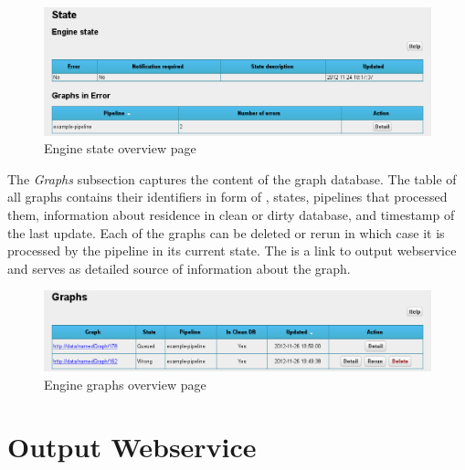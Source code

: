 \begin{figure}[!ht]
    \centering
    \includegraphics[width=\textwidth]{images/fe-engine-state.png}
    \caption{Engine state overview page}
	\label{fig:feEngineState}
\end{figure}
\FloatBarrier

The \emph{Graphs} subsection captures the content of the graph database. The table of all graphs contains their identifiers in form of , states, pipelines that processed them, information about residence in clean or dirty database, and timestamp of the last update. Each of the graphs can be deleted or rerun in which case it is processed by the pipeline in its current state. The  is a link to output webservice and serves as detailed source of information about the graph.

\begin{figure}[!ht]
    \centering
    \includegraphics[width=\textwidth]{images/fe-engine-graphs.png}
    \caption{Engine graphs overview page}
	\label{fig:feEngineGraphs}
\end{figure}

\section{Output Webservice}
\label{sec:outputWSMgmt}

